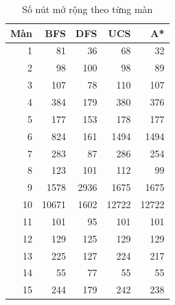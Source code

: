 \clearpage

\begin{table}[htbp]
\centering
\small
\caption{Số nút mở rộng theo từng màn}
\begin{tabular}{|r|r|r|r|r|}
\hline
Màn & BFS & DFS & UCS & A* \\\hline
1  & 81    & 36   & 68    & 32    \\\hline
2  & 98    & 100  & 98    & 89    \\\hline
3  & 107   & 78   & 110   & 107   \\\hline
4  & 384   & 179  & 380   & 376   \\\hline
5  & 177   & 153  & 178   & 177   \\\hline
6  & 824   & 161  & 1494  & 1494  \\\hline
7  & 283   & 87   & 286   & 254   \\\hline
8  & 123   & 101  & 112   & 99    \\\hline
9  & 1578  & 2936 & 1675  & 1675  \\\hline
10 & 10671 & 1602 & 12722 & 12722 \\\hline
11 & 101   & 95   & 101   & 101   \\\hline
12 & 129   & 125  & 129   & 129   \\\hline
13 & 225   & 127  & 224   & 217   \\\hline
14 & 55    & 77   & 55    & 55    \\\hline
15 & 244   & 179  & 242   & 238   \\\hline
\end{tabular}
\end{table}

